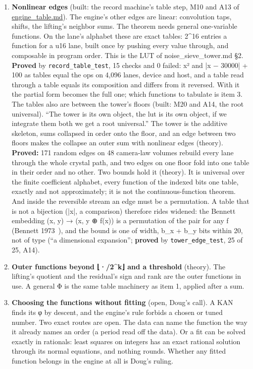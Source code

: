 \begin{enumerate}
\item \textbf{Nonlinear edges} (built: the record machine's table step, M10 and A13 of \hyperref[chap:engine-table]{engine\_\allowbreak{}table.md}). The engine's other edges are linear: convolution taps, shifts, the lifting's neighbor sums. The theorem needs general one-variable functions. On the lane's alphabet these are exact tables: 2\textasciicircum{}16 entries a function for a u16 lane, built once by pushing every value through, and composable in program order. This is the LUT of noise\_\allowbreak{}sieve\_\allowbreak{}tower.md §2. \textbf{Proved} by \texttt{record\_\allowbreak{}table\_\allowbreak{}test}, 15 checks and 0 failed: x² and |x − 30000| + 100 as tables equal the ops on 4,096 lanes, device and host, and a table read through a table equals its composition and differs from it reversed. With it the partial form becomes the full one; which functions to tabulate is item 3. The tables also are between the tower's floors (built: M20 and A14, the root universal). “The tower is its own object, the lut is its own object, if we integrate them both we get a root universal.” The tower is the additive skeleton, sums collapsed in order onto the floor, and an edge between two floors makes the collapse an outer sum with nonlinear edges (theory). \textbf{Proved:} 171 random edges on 48 camera-law volumes rebuild every lane through the whole crystal path, and two edges on one floor fold into one table in their order and no other. Two bounds hold it (theory). It is universal over the finite coefficient alphabet, every function of the indexed bits one table, exactly and not approximately; it is not the continuous-function theorem. And inside the reversible stream an edge must be a permutation. A table that is not a bijection (|x|, a comparison) therefore rides widened: the Bennett embedding (x, y) → (x, y ⊕ f(x)) is a permutation of the pair for any f (Bennett 1973~\cite{src:Bennett-1973}), and the bound is one of width, b\_\allowbreak{}x + b\_\allowbreak{}y bits within 20, not of type (“a dimensional expansion”; \textbf{proved} by \texttt{tower\_\allowbreak{}edge\_\allowbreak{}test}, 25 of 25, A14).
\item \textbf{Outer functions beyond ⌊·/2\textasciicircum{}k⌋ and a threshold} (theory). The lifting's quotient and the residual's sign and rank are the outer functions in use. A general Φ is the same table machinery as item 1, applied after a sum.
\item \textbf{Choosing the functions without fitting} (open, Doug's call). A KAN finds its φ by descent, and the engine's rule forbids a chosen or tuned number. Two exact routes are open. The data can name the function the way it already names an order (a period read off the data). Or a fit can be solved exactly in rationals: least squares on integers has an exact rational solution through its normal equations, and nothing rounds. Whether any fitted function belongs in the engine at all is Doug's ruling.

\end{enumerate}
